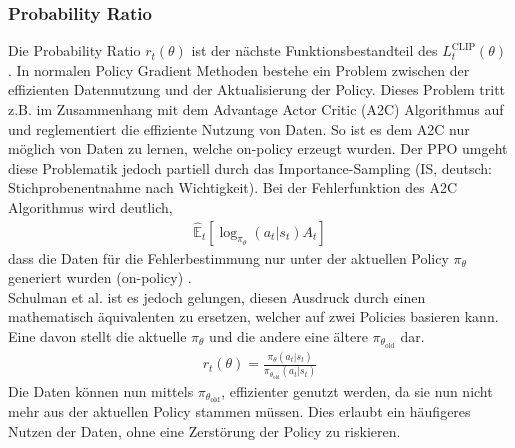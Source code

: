 \subsubsection{Probability Ratio} \label{subsubsec:Grundlagen_Probability_Ratio}
Die Probability Ratio $r_{t}(\theta)$ ist der nächste Funktionsbestandteil des $L^\text{CLIP}_{t} (\theta)$ .
In normalen Policy Gradient Methoden bestehe ein Problem zwischen der effizienten Datennutzung und der Aktualisierung der Policy. Dieses Problem tritt z.B. im Zusammenhang mit dem Advantage Actor Critic (A2C) Algorithmus auf und reglementiert die effiziente Nutzung von Daten. 
So ist es dem A2C nur möglich von Daten zu lernen, welche on-policy  erzeugt wurden.
Der PPO umgeht diese Problematik jedoch partiell durch das Importance-Sampling (IS, deutsch: Stichprobenentnahme nach Wichtigkeit).
Bei der Fehlerfunktion des A2C Algorithmus  wird deutlich,
\begin{align}
	\label{eq:Grundlagen_A2C_Loss}
	\mathbb{\hat{E}}_t[\log_{\pi_{\theta}}(a_t|s_t)A_t]
\end{align}
dass die Daten für die Fehlerbestimmung nur unter der aktuellen Policy $\pi_{\theta}$ generiert wurden (on-policy) \citep[S. 591]{DRL_Lapan}.\\
Schulman et al. ist es jedoch gelungen, diesen Ausdruck durch einen mathematisch äquivalenten zu ersetzen, welcher auf zwei Policies basieren kann. Eine davon stellt die aktuelle $\pi_{\theta}$ und die andere eine ältere $\pi_{\theta_{\text{old}}}$ dar.
\begin{align}
	\label{eq:Grundlagen_Probability_Ratio}
	r_{t}(\theta) = \frac{\pi_{\theta}(a_{t}|s_{t})}{\pi_{\theta_{\text{old}}}(a_{t}|s_{t})}
\end{align}
Die Daten können nun mittels $\pi_{\theta_{\text{old}}}$, effizienter genutzt werden, da sie nun nicht mehr aus der aktuellen Policy stammen müssen. Dies erlaubt ein häufigeres Nutzen der Daten, ohne eine Zerstörung der Policy zu riskieren. \citep[Zeitpunkt: 9:25]{Deep_RL_Bootcamp}

